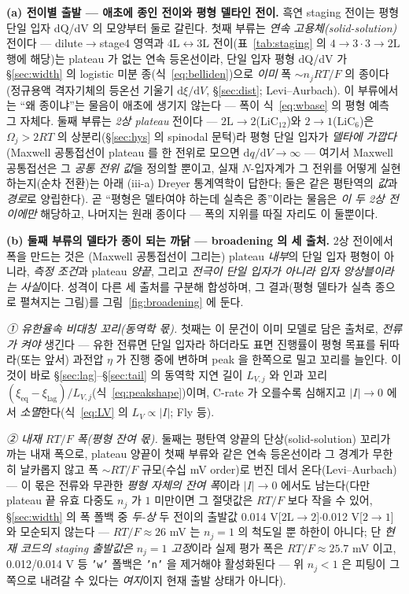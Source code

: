 \documentclass[11pt,a4paper]{article}
\newcommand{\dd}{\mathrm{d}}
\newcommand{\eq}{\mathrm{eq}}
\newcommand{\code}[1]{\texttt{#1}}
\begin{document}
\textbf{(a) 전이별 출발 — 애초에 종인 전이와 평형 델타인 전이.} 흑연 staging 전이는 평형 단일 입자 dQ/dV 의 모양부터
둘로 갈린다. 첫째 부류는 \emph{연속 고용체(solid-solution)} 전이다 — dilute$\to$stage4 영역과 4L$\leftrightarrow$3L
전이(표~\ref{tab:staging} 의 $4\!\to\!3\cdot3\!\to\!2\mathrm L$ 행에 해당)는 plateau 가 없는 연속 등온선이라\cite{rsc2021}, 단일 입자 평형 dQ/dV 가 \S\ref{sec:width} 의 logistic 미분
종(식~\eqref{eq:belliden})으로 \emph{이미} 폭 $\sim n_jRT/F$ 의 종이다(정규용액 격자기체의 등온선 기울기
$\dd\xi/\dd V$, \S\ref{sec:dist}; Levi--Aurbach\cite{leviaurbach1999}). 이 부류에서는 ``왜 종이냐''는 물음이 애초에
생기지 않는다 — 폭이 식~\eqref{eq:wbase} 의 평형 예측 그 자체다. 둘째 부류는 \emph{2상 plateau} 전이다 —
$2\mathrm L\!\to\!2$($\mathrm{LiC_{12}}$)와 $2\!\to\!1$($\mathrm{LiC_6}$)은 $\Omega_j>2RT$ 의 상분리(\S\ref{sec:hys}
의 spinodal 문턱)라 평형 단일 입자가 \emph{델타에 가깝다}(Maxwell 공통접선이 plateau 를 한 전위로 모으면
$\dd q/\dd V\!\to\!\infty$ — 여기서 Maxwell 공통접선은 그 \emph{공통 전위 값}을 정의할 뿐이고, 실재 $N$-입자계가
그 전위를 어떻게 실현하는지(순차 전환)는 아래 (iii-a) Dreyer 통계역학이 답한다; 둘은 같은 평탄역의 \emph{값}과
\emph{경로}로 양립한다). 곧 ``평형은 델타여야 하는데 실측은 종''이라는 물음은 \emph{이 두 2상 전이에만} 해당하고,
나머지는 원래 종이다 — 폭의 지위를 따질 자리도 이 둘뿐이다.

\textbf{(b) 둘째 부류의 델타가 종이 되는 까닭 — broadening 의 세 출처.} 2상 전이에서 폭을 만드는 것은 (Maxwell
공통접선이 그리는) plateau \emph{내부}의 단일 입자 평형이 아니라, \emph{측정 조건}과 plateau \emph{양끝}, 그리고
\emph{전극이 단일 입자가 아니라 입자 앙상블이라는 사실}이다. 성격이 다른 세 출처를 구분해 합성하며, 그 결과(평형 델타가
실측 종으로 펼쳐지는 그림)를 그림~\ref{fig:broadening} 에 둔다.

\emph{① 유한율속 비대칭 꼬리(동역학 몫).} 첫째는 이 문건이 이미 모델로 담은 출처로, \emph{전류가 켜야} 생긴다 — 유한
전류면 단일 입자라 하더라도 표면 진행률이 평형 목표를 뒤따라(또는 앞서) 과전압 $\eta$ 가 진행 중에 변하며 peak 을 한쪽으로
밀고 꼬리를 늘인다. 이것이 바로 \S\ref{sec:lag}--\S\ref{sec:tail} 의 동역학 지연 길이 $L_{V,j}$ 와 인과 꼬리
$(\xi_\eq-\xi_\mathrm{lag})/L_{V,j}$(식~\eqref{eq:peakshape})이며, C-rate 가 오를수록 심해지고 $|I|\!\to\!0$ 에서
\emph{소멸}한다(식~\eqref{eq:LV} 의 $L_V\propto|I|$; Fly 등\cite{fly2020}).

\emph{② 내재 $RT/F$ 폭(평형 잔여 몫).} 둘째는 평탄역 양끝의 단상(solid-solution) 꼬리가 까는 내재 폭으로, plateau
양끝이 첫째 부류와 같은 연속 등온선이라 그 경계가 무한히 날카롭지 않고 폭 $\sim RT/F$ 규모(수십 mV order)로 번진 데서
온다(Levi--Aurbach\cite{leviaurbach1999}) — 이 몫은 전류와 무관한 \emph{평형 자체의 잔여 폭}이라 $|I|\!\to\!0$ 에서도
남는다(다만 plateau 끝 유효 다중도 $n_j$ 가 $1$ 미만이면 그 절댓값은 $RT/F$ 보다 작을 수 있어, \S\ref{sec:width}
의 폭 폴백 중 \emph{두-상} 두 전이의 출발값 0.014 V[$2\mathrm L\!\to\!2$]$\cdot$0.012 V[$2\!\to\!1$]와 모순되지 않는다 —
$RT/F\!\approx\!26$ mV 는 $n_j\!=\!1$ 의 척도일 뿐 하한이 아니다; 단 \emph{현재 코드의 staging 출발값은 $n_j\!=\!1$
고정}이라 실제 평가 폭은 $RT/F\!\approx\!25.7$ mV 이고, 0.012/0.014 V 등 \code{'w'} 폴백은 \code{'n'} 을 제거해야
활성화된다 — 위 $n_j\!<\!1$ 은 피팅이 그쪽으로 내려갈 수 있다는 \emph{여지}이지 현재 출발 상태가 아니다).
\end{document}
